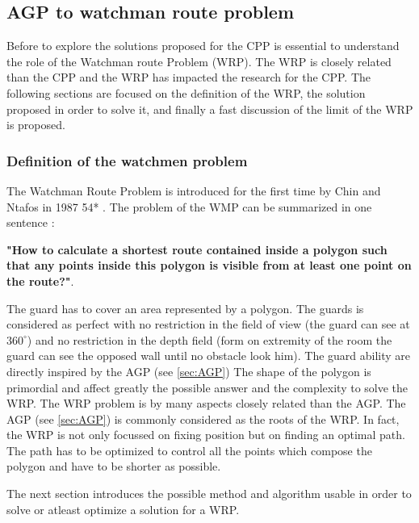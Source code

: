 \subsection{AGP  to watchman route problem}


Before to explore the solutions proposed for the CPP is essential to understand the role of the Watchman route Problem (WRP). The WRP is closely related than the CPP and the WRP has impacted the research for the CPP. 
The following sections are focused on the definition of the WRP, the solution proposed in order to solve it, and finally a fast discussion of the limit of the WRP  is proposed.
 
\subsubsection{Definition of the watchmen problem }

The Watchman Route Problem is introduced for the first time by Chin and Ntafos in 1987 54* \cite{54chin} . The problem of the WMP can be summarized in one sentence :

\textbf{"How to calculate a shortest route contained inside a polygon such that any points inside this polygon is visible from at least one point on the route?"}.  

The guard has to cover an area represented by a polygon. The guards is considered as perfect with no restriction in the field of view (the guard can see at $360^\circ$) and no restriction in the depth field (form on extremity of the room the guard can see the opposed wall until no obstacle look him).  The guard ability are directly inspired by the AGP (see \ref{sec:AGP})
The shape of the polygon is primordial and affect greatly the possible answer and the complexity to solve the WRP.
The WRP problem is by many aspects closely related than the AGP. The AGP (see \ref{sec:AGP}) is commonly considered as the roots of the WRP.
 In fact, the  WRP is not only focussed on fixing position but on finding an optimal path. The path has to be optimized to control all the points which compose the polygon  and have to be shorter as possible.
 
 The next section introduces the possible method and algorithm usable in order to solve or atleast optimize a solution for a WRP.
 


